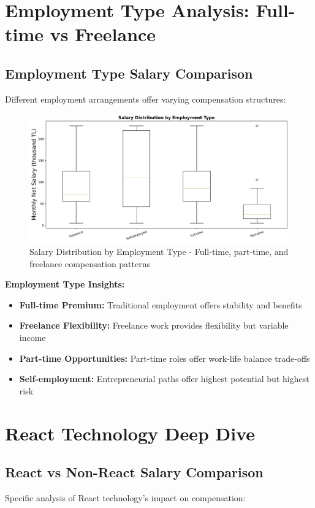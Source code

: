 \documentclass[12pt,a4paper]{article}
\begin{document}
\section{Employment Type Analysis: Full-time vs Freelance}

\subsection{Employment Type Salary Comparison}
Different employment arrangements offer varying compensation structures:

\begin{figure}[H]
    \centering
    \includegraphics[width=\textwidth]{figures/boxplot_employment_type.png}
    \caption{Salary Distribution by Employment Type - Full-time, part-time, and freelance compensation patterns}
\end{figure}

\textbf{Employment Type Insights:}
\begin{itemize}
    \item \textbf{Full-time Premium:} Traditional employment offers stability and benefits
    \item \textbf{Freelance Flexibility:} Freelance work provides flexibility but variable income
    \item \textbf{Part-time Opportunities:} Part-time roles offer work-life balance trade-offs
    \item \textbf{Self-employment:} Entrepreneurial paths offer highest potential but highest risk
\end{itemize}

\section{React Technology Deep Dive}

\subsection{React vs Non-React Salary Comparison}
Specific analysis of React technology's impact on compensation:
\end{document}
